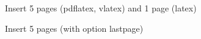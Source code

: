 \documentclass[a4paper]{article}
\begin{document}
Insert 5 pages (pdflatex, vlatex) and 1 page (latex)


Insert 5 pages (with option lastpage)

\end{document}
